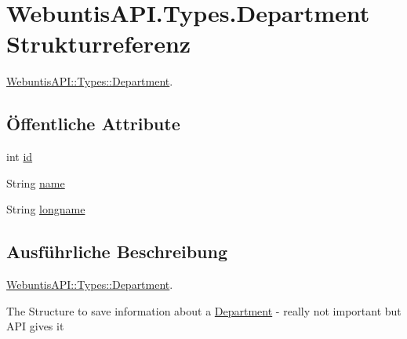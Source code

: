 \hypertarget{struct_webuntis_a_p_i_1_1_types_1_1_department}{\section{Webuntis\-A\-P\-I.\-Types.\-Department Strukturreferenz}
\label{struct_webuntis_a_p_i_1_1_types_1_1_department}
}


\hyperlink{struct_webuntis_a_p_i_1_1_types_1_1_department}{Webuntis\-A\-P\-I\-::\-Types\-::\-Department}.  


\subsection*{Öffentliche Attribute}
\begin{DoxyCompactItemize}
\item 
int \hyperlink{struct_webuntis_a_p_i_1_1_types_1_1_department_a543d6d34378c9649d7cf72ea88bfbb61}{id}
\item 
String \hyperlink{struct_webuntis_a_p_i_1_1_types_1_1_department_aa2a3990003b54bc6a9946be1c2ab5572}{name}
\item 
String \hyperlink{struct_webuntis_a_p_i_1_1_types_1_1_department_ac9d9a76d977fbdccfd18a7f88c88fbac}{longname}
\end{DoxyCompactItemize}


\subsection{Ausführliche Beschreibung}
\hyperlink{struct_webuntis_a_p_i_1_1_types_1_1_department}{Webuntis\-A\-P\-I\-::\-Types\-::\-Department}. 

The Structure to save information about a \hyperlink{struct_webuntis_a_p_i_1_1_types_1_1_department}{Department} -\/ really not important but A\-P\-I gives it 

